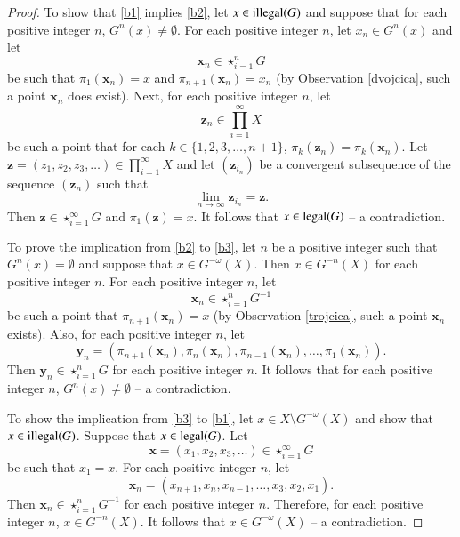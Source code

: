 \documentclass[a4paper,12pt]{article} %
\newcommand{\illegal}{\textup{illegal}}
\newcommand{\legal}{\textup{legal}}
\newtheorem{lemma}[theorem]{Lemma}
\begin{document}
\begin{proof}
To show that \ref{b1} implies \ref{b2}, let $x\in \illegal(G)$ and suppose that for each positive integer $n$,  $G^n(x)\neq \emptyset$.  For each positive integer $n$, let 
$x_n\in G^n(x)$ and let 
$$
\mathbf x_n\in \star_{i=1}^{n}G
$$
be such that $\pi_1(\mathbf x_n)=x$ and $\pi_{n+1}(\mathbf x_n)=x_n$ (by Observation \ref{dvojcica}, such a point $\mathbf x_n$ does exist). Next,  for each positive integer $n$, let
$$
\mathbf z_n\in  \prod_{i=1}^{\infty}X
$$
be such a point that for each $k\in \{1,2,3,\ldots, n+1\}$, $\pi_k(\mathbf z_n)=\pi_k(\mathbf x_n)$. Let $\mathbf z=(z_1,z_2,z_3,\ldots)\in \prod_{i=1}^{\infty}X$ and let $(\mathbf z_{i_n})$ be a convergent subsequence of the sequence $(\mathbf z_n)$ such that 
$$
\lim_{n\to \infty}\mathbf z_{i_n}=\mathbf z.
$$
Then $\mathbf z\in \star_{i=1}^{\infty}G$ and $\pi_1(\mathbf z)=x$. It follows that $x\in \legal(G)$  -- a  contradiction.


To prove the implication from \ref{b2} to \ref{b3}, let $n$ be a positive integer such that $G^n(x)=\emptyset$ and suppose that $x\in G^{-\omega}(X)$.  Then $x\in G^{-n}(X)$ for each positive integer $n$.  For each positive integer $n$, let 
$$
\mathbf x_n\in \star_{i=1}^{n}G^{-1}
$$
be such a point that $\pi_{n+1}(\mathbf x_n)=x$ (by Observation \ref{trojcica}, such a point $\mathbf x_n$ exists). Also, for each positive integer $n$, let 
$$
\mathbf y_n=(\pi_{n+1}(\mathbf x_n), \pi_{n}(\mathbf x_n), \pi_{n-1}(\mathbf x_n),\ldots ,\pi_{1}(\mathbf x_n) ).
$$
Then  $\mathbf y_n\in \star_{i=1}^{n}G$ for each positive integer $n$. It follows that  for each positive integer $n$, $G^n(x)\neq\emptyset$  -- a  contradiction.

To show the implication from \ref{b3} to \ref{b1}, let $x\in X\setminus G^{-\omega}(X)$ and show that $x\in \illegal(G)$.  Suppose that $x\in \legal(G)$.  Let 
$$
\mathbf x=(x_1,x_2,x_3,\ldots)\in \star_{i=1}^{\infty}G
$$
be such that $x_1=x$.   For each positive integer $n$, let 
$$
\mathbf x_n=(x_{n+1},x_n,x_{n-1},\ldots, x_3,x_2,x_1).
$$
Then $\mathbf x_n\in \star_{i=1}^{n}G^{-1}$ for each positive integer $n$.  Therefore, for each positive integer $n$, $x\in G^{-n}(X)$. It follows that $x\in G^{-\omega}(X)$  -- a  contradiction. 
\end{proof}
\end{document}
